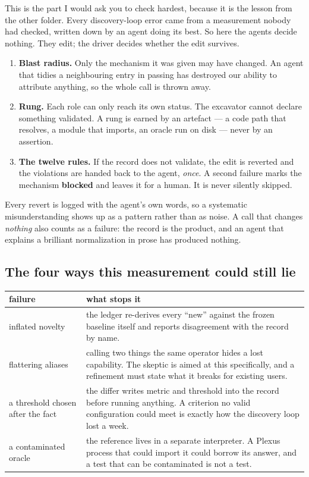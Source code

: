 \documentclass[11pt,a4paper]{article}
\begin{document}
This is the part I would ask you to check hardest, because it is the lesson from the other folder.
Every discovery-loop error came from a measurement nobody had checked, written down by an agent
doing its best. So here the agents decide nothing. They edit; the driver decides whether the edit
survives.

\begin{enumerate}[leftmargin=1.4em]
\item \textbf{Blast radius.} Only the mechanism it was given may have changed. An agent that tidies
a neighbouring entry in passing has destroyed our ability to attribute anything, so the whole call
is thrown away.
\item \textbf{Rung.} Each role can only reach its own status. The excavator cannot declare
something validated. A rung is earned by an artefact --- a code path that resolves, a module that
imports, an oracle run on disk --- never by an assertion.
\item \textbf{The twelve rules.} If the record does not validate, the edit is reverted and the
violations are handed back to the agent, \emph{once}. A second failure marks the mechanism
\textbf{blocked} and leaves it for a human. It is never silently skipped.
\end{enumerate}

Every revert is logged with the agent's own words, so a systematic misunderstanding shows up as a
pattern rather than as noise. A call that changes \emph{nothing} also counts as a failure: the
record is the product, and an agent that explains a brilliant normalization in prose has produced
nothing.

\subsection{The four ways this measurement could still lie}

\begin{center}
\small
\begin{tabular}{@{}p{3.4cm} p{11.6cm}@{}}
\toprule
\textbf{failure} & \textbf{what stops it}\\
\midrule
inflated novelty & the ledger re-derives every ``new'' against the frozen baseline itself and
reports disagreement with the record by name.\\
flattering aliases & calling two things the same operator hides a lost capability. The skeptic is
aimed at this specifically, and a refinement must state what it breaks for existing users.\\
a threshold chosen after the fact & the differ writes metric and threshold into the record before
running anything. A criterion no valid configuration could meet is exactly how the discovery loop
lost a week.\\
a contaminated oracle & the reference lives in a separate interpreter. A Plexus process that could
import it could borrow its answer, and a test that can be contaminated is not a test.\\
\bottomrule
\end{tabular}
\end{center}
\end{document}
